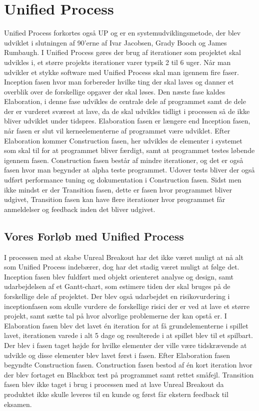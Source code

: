 \section{Unified Process}
Unified Process forkortes også UP og er en systemudviklingsmetode, der blev udviklet i slutningen af 90'erne af Ivar Jacobsen, Grady Booch og James Rumbaugh. I Unified Process gøres der brug af iterationer som projektet skal udvikles i, et større projekts iterationer varer typsik 2 til 6 uger. Når man udvikler et stykke software med Unified Process skal man igennem fire faser. Inception fasen hvor man forbereder hvilke ting der skal laves og danner et overblik over de forskellige opgaver der skal løses. Den næste fase kaldes Elaboration, i denne fase udvikles de centrale dele af programmet samt de dele der er vurderet sværest at lave, da de skal udvikles tidligt i processen så de ikke bliver udviklet under tidspres. Elaboration fasen er længere end Inception fasen, når fasen er slut vil kerneelementerne af programmet være udviklet. Efter Elaboration kommer Construction fasen, her udvikles de elementer i systemet som skal til for at programmet bliver færdigt, samt at programmet testes løbende igennem fasen. Construction fasen består af mindre iterationer, og det er også fasen hvor man begynder at alpha teste programmet. Udover tests bliver der også udført performance tuning og dokumentation i Construction fasen. Sidst men ikke mindst er der Transition fasen, dette er fasen hvor programmet bliver udgivet, Transition fasen kan have flere iterationer hvor programmet får anmeldelser og feedback inden det bliver udgivet. \newline
\newline
\subsection{Vores Forløb med Unified Process}
I processen med at skabe Unreal Breakout har det ikke været muligt at nå alt som Unified Process indebærer, dog har det stadig været muligt at følge det. Inception fasen blev fuldført med objekt orienteret analyse og design, samt udarbejdelsen af et Gantt-chart, som estimere tiden der skal bruges på de forskellige dele af projektet. Der blev også udarbejdet en risikovurdering i inceptionfasen som skulle vurdere de forskellige risici der er ved at lave et større projekt, samt sætte tal på hvor alvorlige problemerne der kan opstå er. \newline
I Elaboration fasen blev det lavet én iteration for at få grundelementerne i spillet lavet, iterationen varede i alt 5 dage og resulterede i at spillet blev til et spilbart. Der blev i fasen taget højde for hvilke elementer der ville være tidskrævende at udvikle og disse elementer blev lavet først i fasen. \newline
Efter Elaboration fasen begyndte Construction fasen. Construction fasen bestod af én kort iteration hvor der blev fortaget en Blackbox test på programmet samt rettet småfejl. 
\newline
Transition fasen blev ikke taget i brug i processen med at lave Unreal Breakout da produktet ikke skulle leveres til en kunde og først får ekstern feedback til eksamen. 
 
